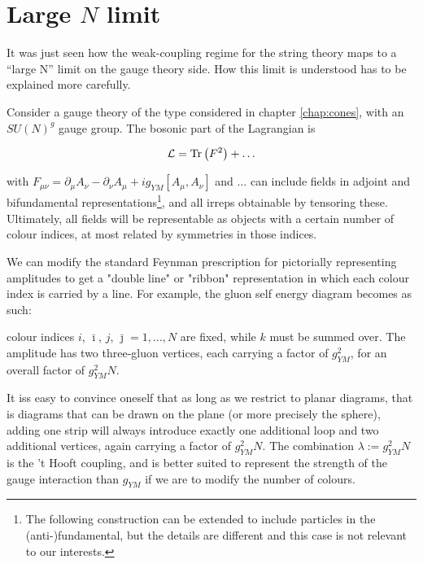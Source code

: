 \section{Large $N$ limit}

It was just seen how the weak-coupling regime for the string theory maps to a ``large N'' limit on the gauge theory side. How this limit is understood has to be explained more carefully.

Consider a gauge theory of the type considered in chapter \ref{chap:cones}, with an $SU(N)^g$ gauge group. The bosonic part of the Lagrangian is

\begin{equation}
\mathcal{L} = \operatorname{Tr} \left(F^2\right) + \ldots 
\end{equation}

with $F_{\mu\nu} = \partial_\mu A_\nu - \partial_\nu A_\mu + i g_{YM} [A_\mu,A_\nu]$ and $\ldots$ can include fields in adjoint and bifundamental representations\footnote{The following construction can be extended to include particles in the (anti-)fundamental, but the details are different and this case is not relevant to our interests.}, and all irreps obtainable by tensoring these. Ultimately, all fields will be representable as objects with a certain number of colour indices, at most related by symmetries in those indices.

We can modify the standard Feynman prescription for pictorially representing amplitudes to get a "double line" or "ribbon" representation in which each colour index is carried by a line. For example, the gluon self energy diagram becomes as such:

\begin{center}
\def\svgwidth{200pt}

\end{center}

colour indices $i$, $\bar\imath$, $j$, $\bar\jmath = 1 , \ldots , N$ are fixed, while $k$ must be summed over. The amplitude has two three-gluon vertices, each carrying a factor of $g_{YM}^2$, for an overall factor of $g_{YM}^2 N$.

It iss easy to convince oneself that as long as we restrict to planar diagrams, that is diagrams that can be drawn on the plane (or more precisely the sphere), adding one strip will always introduce exactly one additional loop and two additional vertices, again carrying a factor of $g_{YM}^2 N$. The combination $\lambda := g_{YM}^2 N$ is the 't Hooft coupling, and is better suited to represent the strength of the gauge interaction than $g_{YM}$ if we are to modify the number of colours.

